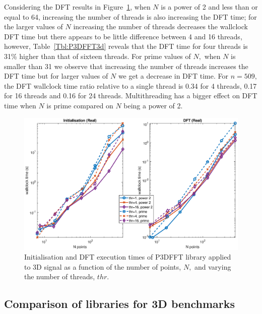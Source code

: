\documentclass[a4paper]{article}
\begin{document}
Considering the DFT results in Figure~\ref{3DP3DFFT}, when $N$ is a
power of 2 and less than or equal to 64, increasing the number of
threads is also increasing the DFT time; for the larger values of $N$
increasing the number of threads decreases the wallclock DFT time but
there appears to be little difference between 4 and 16 threads,
however, Table~\ref{Tbl:P3DFFT3d} reveals that the DFT time for four
threads is 31\% higher than that of sixteen threads. For prime values
of $N,$ when $N$ is smaller than 31 we observe that increasing the
number of threads increases the DFT time but for larger values of $N$
we get a decrease in DFT time. For $n=509,$ the DFT wallclock time
ratio relative to a single thread is 0.34 for 4 threads, 0.17 for 16
threads and 0.16 for 24 threads. Multithreading has a bigger effect on
DFT time when $N$ is prime compared on $N$ being a power of 2.



\begin{figure}[htb]
    \centering
    \includegraphics[width=0.9\linewidth]{../results/p3dfft_3d_thr.eps}
  \caption{Initialisation and DFT execution times of P3DFFT library applied to 3D signal as a function of the
    number of points, $N,$ and varying the number of threads, $thr.$ }
  \label{3DP3DFFT}
\end{figure}







\subsection{Comparison of libraries for 3D benchmarks}\label{Sec:3DComp}
\end{document}

